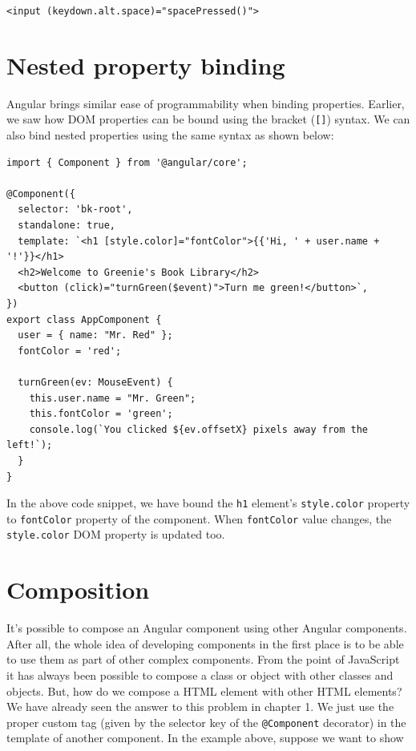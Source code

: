 \documentclass{report}
\begin{document}
\verb|<input (keydown.alt.space)="spacePressed()">|

\section{Nested property binding}
Angular brings similar ease of programmability when binding properties. Earlier, we saw how DOM properties can be bound using the bracket (\verb|[]|) syntax. We can also bind nested properties using the same syntax as shown below:

\begin{Verbatim}[label=2.1.6]
import { Component } from '@angular/core';

@Component({
  selector: 'bk-root',
  standalone: true,
  template: `<h1 [style.color]="fontColor">{{'Hi, ' + user.name + '!'}}</h1>
  <h2>Welcome to Greenie's Book Library</h2>
  <button (click)="turnGreen($event)">Turn me green!</button>`,
})
export class AppComponent {
  user = { name: "Mr. Red" };
  fontColor = 'red';

  turnGreen(ev: MouseEvent) {
    this.user.name = "Mr. Green";
    this.fontColor = 'green';
    console.log(`You clicked ${ev.offsetX} pixels away from the left!`);
  }
}
\end{Verbatim}

In the above code snippet, we have bound the \verb|h1| element's \verb|style.color| property to \verb|fontColor| property of the component. When \verb|fontColor| value changes, the \verb|style.color| DOM property is updated too.

\section{Composition}
It's possible to compose an Angular component using other Angular components. After all, the whole idea of developing components in the first place is to be able to use them as part of other complex components. From the point of JavaScript it has always been possible to compose a class or object with other classes and objects. But, how do we compose a HTML element with other HTML elements? We have already seen the answer to this problem in chapter 1. We just use the proper custom tag (given by the selector key of the \verb|@Component| decorator) in the template of another component. In the example above, suppose we want to show 
\end{document}
